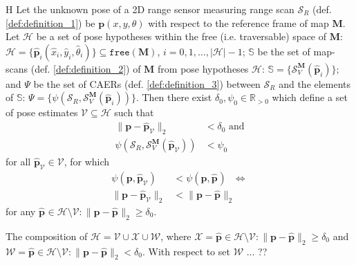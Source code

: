 
\begin{customhpt}{H}
  \label{hpt:hypothesis_h}
  Let the unknown pose of a 2D range sensor measuring range scan $\mathcal{S}_R$
  (def. \ref{def:definition_1}) be $\bm{p}(x,y,\theta)$ with respect to the
  reference frame of map $\bm{M}$.  Let $\mathcal{H}$ be a set of pose
  hypotheses within the free (i.e. traversable) space of $\bm{M}$:
  $\mathcal{H} = \{\hat{\bm{p}}_i(\hat{x}_i,\hat{y}_i,\hat{\theta}_i)\} \subseteq \texttt{free}(\bm{M})$, $i=0,1,\dots,|\mathcal{H}|-1$; $\mathbb{S}$
  be the set of map-scans (def. \ref{def:definition_2}) of $\bm{M}$ from pose
  hypotheses $\mathcal{H}$:
  $\mathbb{S} = \{\mathcal{S}_V^{\bm{M}}(\hat{\bm{p}}_i)\}$; and $\Psi$ be the
  set of CAERs (def. \ref{def:definition_3}) between $\mathcal{S}_R$ and the
  elements of $\mathbb{S}$:
  $\Psi = \{\psi(\mathcal{S}_R, \mathcal{S}_V^{\bm{M}}(\hat{\bm{p}}_i))\}$.
  Then there exist $\delta_0,\psi_0 \in \mathbb{R}_{> 0}$ which define a set of
  pose estimates $\mathcal{V} \subseteq \mathcal{H}$ such that
  \begin{align}
    \|\bm{p}-\hat{\bm{p}}_\mathcal{V}\|_2 &< \delta_0 \nonumber \text{ and}\\
    \psi(\mathcal{S}_R,\mathcal{S}_V^{\bm{M}}(\hat{\bm{p}}_\mathcal{V})) &< \psi_0 \nonumber
  \end{align}
  for all $\hat{\bm{p}}_\mathcal{V} \in \mathcal{V}$, for which
  \begin{align}
    \psi(\bm{p}, \hat{\bm{p}}_\mathcal{V}) &< \psi(\bm{p}, \hat{\bm{p}}_{}) \ \ \ \Leftrightarrow \nonumber \\
    \|\bm{p}-\hat{\bm{p}}_\mathcal{V}\|_2 &< \|\bm{p}-\hat{\bm{p}}_{}\|_2 \nonumber
  \end{align}
  for any $\hat{\bm{p}}_{} \in {\mathcal{H} \setminus  \mathcal{V}}: \|\bm{p}-\hat{\bm{p}}_{}\|_2 \geq \delta_0$.
\end{customhpt}

\begin{remark}
  \label{rem:remark_1}
  The composition of
  $\mathcal{H} = \mathcal{V} \cup \mathcal{X} \cup \mathcal{W}$, where
  $\mathcal{X} = \hat{\bm{p}} \in {\mathcal{H} \setminus \mathcal{V}}: \|\bm{p}-\hat{\bm{p}}\|_2 \geq \delta_0$ and
  $\mathcal{W} = \hat{\bm{p}} \in {\mathcal{H} \setminus \mathcal{V}}: \|\bm{p}-\hat{\bm{p}}\|_2 < \delta_0$.
  With respect to set $\mathcal{W}$ ... ??

\end{remark}

